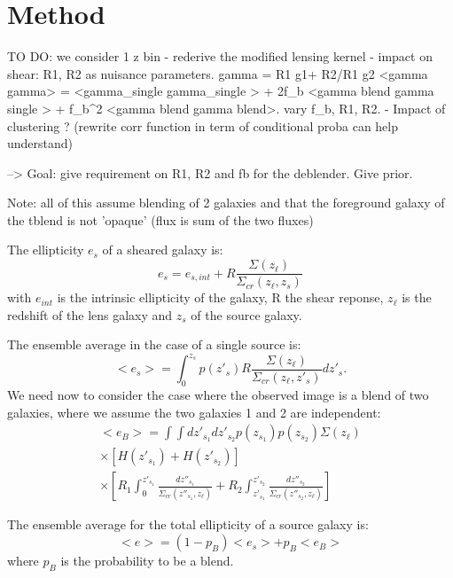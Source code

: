 \documentclass[prd,amsmath,aps,floats,amssymb, floatfix, superscriptaddress,nofootinbib,preprintnumbers,twocolumn]{article}  %
\begin{document}
 
 
 

\section{Method}
\label{sec:method}

TO DO: we consider 1 z bin
- rederive the modified lensing kernel
- impact on shear: R1, R2 as nuisance parameters.
gamma = R1 g1+ R2/R1 g2
<gamma gamma> = <gamma_single gamma_single > + 2f_b <gamma blend gamma single > + f_b^2 <gamma blend gamma blend>.
vary f_b, R1, R2. 
- Impact of clustering ? (rewrite corr function in term of conditional proba can help understand) 

--> Goal: give requirement on R1, R2 and fb for the deblender. Give prior. 


Note: all of this assume blending of 2 galaxies and that the foreground galaxy of the tblend is not 'opaque' (flux is sum of the two fluxes) 

The ellipticity $e_s$ of a sheared galaxy is: 
\begin{equation}
e_s = e_{s,int} + R \frac{\Sigma (z_{\ell})}{\Sigma_{cr}(z_{\ell},z_s)}
\end{equation}
with $e_{int}$ is the intrinsic ellipticity of the galaxy, R the shear reponse, $z_{\ell}$ is the redshift of the lens galaxy and $z_s$ of the source galaxy.

The ensemble average in the case of a single source is: 
\begin{equation}
<e_s> = \int_0^{z_s} p(z'_s) R \frac{\Sigma (z_{\ell})}{\Sigma_{cr}(z_{\ell},z'_s)} dz'_s.
\end{equation}
We need now to consider the case where the observed image is a blend of two galaxies, where we assume the two galaxies 1 and 2 are independent: 
\begin{multline}
<e_B>  = \int \int dz'_{s_1} dz'_{s_2} p(z_{s_1})p(z_{s_2}) \Sigma(z_{\ell}) \\
\times [H(z'_{s_1}) + H(z'_{s_2})]  \\
\times [ R_1 \int_0^{z'_{s_1}} \frac{dz''_{s_1}}{\Sigma_{cr}(z''_{s_1},z_{\ell})} 
+ R_2 \int_{z'_{s_1}}^{z'_{s_2}} \frac{dz''_{s_2}}{\Sigma_{cr}(z''_{s_2},z_{\ell})}  ]
\label{eq:ellblend}
\end{multline}


The ensemble average for the total ellipticity of a source galaxy is: 
\begin{equation}
<e> = (1 - p_B) <e_s> + p_B <e_B> 
\end{equation}
where $p_B$ is the probability to be a blend. 
\end{document}
